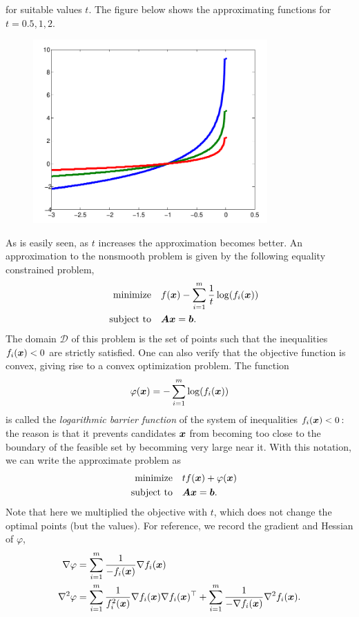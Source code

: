 for suitable values $t$. The figure below shows the approximating functions for $t=0.5,1,2$. 
\begin{figure}[h!]
 \centering
 \includegraphics[width=0.8\textwidth]{images/logbarrier_cropped.pdf}
 \label{fig:1}
\end{figure}
As is easily seen, as $t$ increases the approximation becomes better.
An approximation to the nonsmooth problem is given by the following equality constrained problem,
\begin{align*}
\begin{split}
\text{minimize}\quad & f(\bm{x})-\sum_{i=1}^{m} \frac{1}{t}\log(f_i(\bm{x}))\\
\quad\text{subject to}\quad & \bm{A}\bm{x}=\bm{b}.
\end{split}
\end{align*}
The domain $\mathcal{D}$ of this problem is the set of points such that the inequalities $f_i(\bm{x})<0$ are strictly satisfied. One can also verify that the objective function is convex, giving rise to a convex optimization problem.
The function
\begin{equation*}
 \varphi(\bm{x}) = -\sum_{i=1}^m \log(f_i(\bm{x}))
\end{equation*}
is called the {\em logarithmic barrier function} of the system of inequalities $f_i(\bm{x})<0$: the reason is that it prevents candidates $\bm{x}$ from becoming too close to the boundary of the feasible set by becomming very large near it. With this notation, we can write the approximate problem as
\begin{align}\label{eq:logbarrier}
\begin{split}
\text{minimize}\quad & tf(\bm{x})+\varphi(\bm{x})\\
\quad\text{subject to}\quad & \bm{A}\bm{x}=\bm{b}.
\end{split}
\end{align}
Note that here we multiplied the objective with $t$, which does not change the optimal points (but the values).
For reference, we record the gradient and Hessian of $\varphi$,
\begin{align*}
 \nabla \varphi &= \sum_{i=1}^m \frac{1}{-f_i(\bm{x})}\nabla f_i(\bm{x})\\
 \nabla^2\varphi &= \sum_{i=1}^m \frac{1}{f_i^2(\bm{x})}\nabla f_i(\bm{x})\nabla f_i(\bm{x})^{\top}+\sum_{i=1}^m \frac{1}{-\nabla f_i(\bm{x})}\nabla^2 f_i(\bm{x}).
\end{align*}

